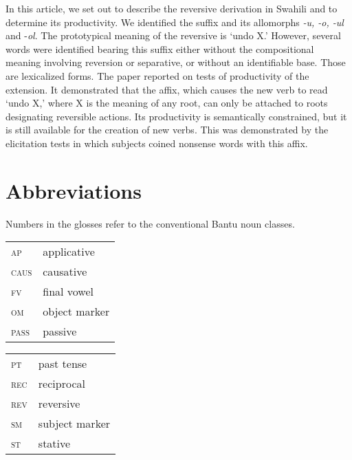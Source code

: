 \documentclass[output=paper]{langsci/langscibook}
\begin{document}
In this article, we set out to describe the reversive derivation in Swahili and to determine its productivity. We identified the suffix and its allomorphs \textit{-u, -o, -ul} and  -\textit{ol}. The prototypical meaning of the reversive is ‘undo X.’ However, several words were identified bearing this suffix either without the compositional meaning involving reversion or separative, or without an identifiable base. Those are lexicalized forms. The paper reported on tests of productivity of the extension. It demonstrated that the affix, which causes the new verb to read ‘undo X,’ where X is the meaning of any root, can only be attached to roots designating reversible actions. Its productivity is semantically constrained, but it is still available for the creation of new verbs. This was demonstrated by the elicitation tests in which subjects coined nonsense words with this affix. 

\section*{Abbreviations} 

Numbers in the glosses refer to the conventional Bantu noun classes.\\

\begin{tabularx}{.45\textwidth}{lX}
\textsc{ap} & applicative  \\

\textsc{caus} &  causative  \\ 

\textsc{fv} &  final vowel \\

\textsc{om} & object marker \\ 

\textsc{pass} & passive  \\
\end{tabularx}
\begin{tabularx}{.45\textwidth}{lX}
\textsc{pt} & past tense \\

\textsc{rec} & reciprocal  \\

\textsc{rev} & reversive \\ 

\textsc{sm} & subject marker \\

\textsc{st} & stative \\
\end{tabularx}       
\end{document}
